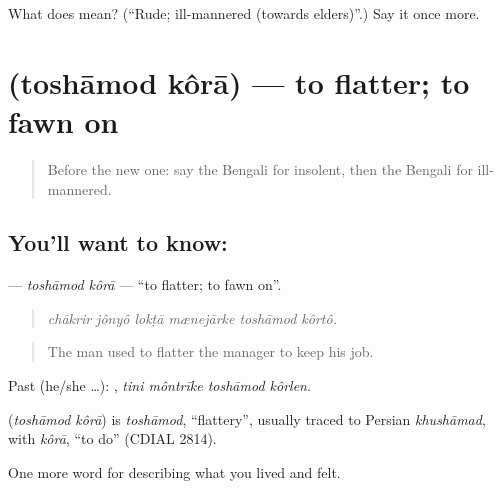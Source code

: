 \begin{tcolorbox}[breakable,colback=teal!4,colframe=teal!35!black,title={Before you move on}]
What does  mean? (\textquotedblleft{}Rude; ill-mannered (towards elders)\textquotedblright{}.) Say it once more.
\end{tcolorbox}
\section[\texorpdfstring{\bn{তোষামোদ} \bn{করা} (toshāmod kôrā)}{তোষামোদ করা (toshāmod kôrā)}]{  (toshāmod kôrā) — to flatter; to fawn on}

\label{lesson:BN-C459-toshamod-kora}



\begin{quote}
Before the new one: say the Bengali for insolent, then the Bengali for ill-mannered.
\end{quote}

\subsection*{You'll want to know:  }
\textbf{ } — \emph{toshāmod kôrā} — \textquotedblleft{}to flatter; to fawn on\textquotedblright{}.

\begin{quote}
     
\end{quote}

\begin{quote}
\emph{chākrir jônyô lokṭā mænejārke toshāmod kôrtô.}
\end{quote}

\begin{quote}
The man used to flatter the manager to keep his job.
\end{quote}

Past (he/she …):    , \emph{tini môntrīke toshāmod kôrlen}.

\begin{cousinweb}
\textbf{ } (\emph{toshāmod kôrā}) is \emph{toshāmod}, \textquotedblleft{}flattery\textquotedblright{}, usually traced to Persian \emph{khushāmad}, with \emph{kôrā}, \textquotedblleft{}to do\textquotedblright{} (CDIAL 2814).
\end{cousinweb}

\begin{grammarlens}[title={What you've built}]
One more word for describing what you lived and felt.
\end{grammarlens}

